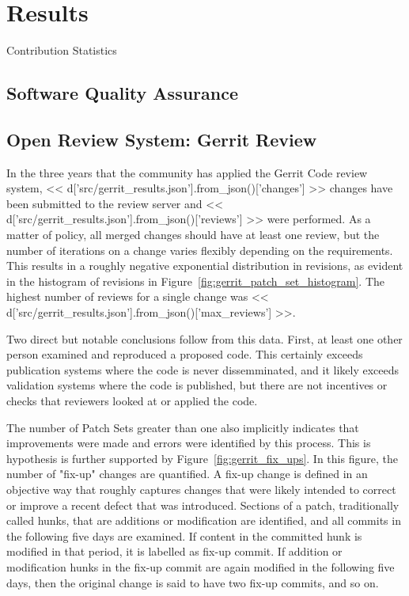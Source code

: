 \documentclass{frontiersENG} %
\begin{document}
\section{Results}

Contribution Statistics
\subsection{Software Quality Assurance}

\subsection{Open Review System: Gerrit Review}
In the three years that the community has applied the Gerrit Code review
system, << d['src/gerrit_results.json'].from_json()['changes'] >> changes have
been submitted to the review server and
<< d['src/gerrit_results.json'].from_json()['reviews'] >> were performed.
As a matter of policy, all merged changes should have at least one review,
but the number of iterations on a change varies flexibly depending on the
requirements. This results in a roughly negative exponential distribution in
revisions, as evident in the histogram of revisions in
Figure~\ref{fig:gerrit_patch_set_histogram}.  The highest number of reviews
for a single change was
<< d['src/gerrit_results.json'].from_json()['max_reviews'] >>.

Two direct but notable conclusions follow from this data. First, at least one
other person examined and reproduced a proposed code.  This certainly exceeds
publication systems where the code is never dissemminated, and it likely
exceeds validation systems where the code is published, but there are not
incentives or checks that reviewers looked at or applied the code.

The number of Patch Sets greater than one also implicitly indicates that
improvements were made and errors were identified by this process.  This is
hypothesis is further supported by Figure~\ref{fig:gerrit_fix_ups}.  In this
figure, the number of "fix-up" changes are quantified. A fix-up change is
defined in an objective way that roughly captures changes that were likely
intended to correct or improve a recent defect that was introduced.  Sections
of a patch, traditionally called hunks, that are additions or modification are
identified, and all commits in the following five days are examined.  If
content in the committed hunk is modified in that period, it is labelled as
fix-up commit.  If addition or modification hunks in the fix-up commit are again
modified in the following five days, then the original change is said to have
two fix-up commits, and so on.
\end{document}
